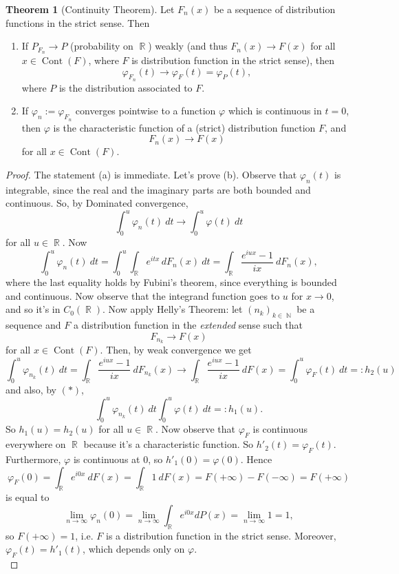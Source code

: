 \documentclass[12pt,a4paper]{report}
\theoremstyle{definition}
\newtheorem{theorem}{Theorem}[chapter] %
\theoremstyle{num.custom-title}
\DeclareMathOperator{\N}{\mathbb{N}}
\DeclareMathOperator{\R}{\mathbb{R}}
\DeclareMathOperator{\Cont}{Cont}
\renewcommand{\phi}{\varphi}
\renewcommand{\1}{\mathbbm{1}}
\begin{document}
\begin{theorem}[Continuity Theorem]
Let $F_n(x)$ be a sequence of distribution functions in the strict sense. Then
\begin{enumerate}
\item If $P_{F_n} \to P$ (probability on $\R$) weakly (and thus $F_n(x) \to F(x)$ for all $x \in \Cont(F)$, where $F$ is distribution function in the strict sense), then
\[
\phi_{F_n}(t) \to \phi_F(t) = \phi_P(t),
\]
where $P$ is the distribution associated to $F$.
\item If $\phi_n := \phi_{F_n}$ converges pointwise to a function $\phi$ which is continuous in $t=0$, then $\phi$ is the characteristic function of a (strict) distribution function $F$, and
\[
F_n(x) \to F(x)
\]
for all $x \in \Cont(F)$.
\end{enumerate}
\begin{proof}
The statement (a) is immediate. Let's prove (b). Observe that $\phi_n(t)$ is integrable, since the real and the imaginary parts are both bounded and continuous. So, by Dominated convergence,
\[
\int_0^u \phi_n(t) \ dt \to \int_0^u \phi(t) \ dt \tag{$(*)$}
\]
for all $u \in \R$. Now
\[
\int_0^u \phi_n(t) \ dt = \int_0^u \int_{\R} e^{itx} \, dF_n(x) \ dt = \int_{\R} \frac{e^{iux}-1}{ix} \ dF_n(x),
\]
where the last equality holds by Fubini's theorem, since everything is bounded and continuous. Now observe that the integrand function goes to $u$ for $x \to 0$, and so it's in $C_0(\R)$. Now apply Helly's Theorem: let $(n_k)_{k \in \N}$ be a sequence and $F$ a distribution function in the \emph{extended} sense such that
\[
F_{n_k} \to F(x)
\]
for all $x \in \Cont(F)$. Then, by weak convergence we get
\[
\int_0^u \phi_{n_k}(t) \ dt = \int_{\R} \frac{e^{iux}-1}{ix} \ dF_{n_k}(x) \to \int_{\R} \frac{e^{iux}-1}{ix} \ dF(x) = \int_0^u \phi_F(t) \ dt =: h_2(u)
\]
and also, by $(*)$,
\[
\int_0^u \phi_{n_k}(t) \ dt \int_0^u \phi(t) \ dt =: h_1(u).
\]
So $h_1(u) = h_2(u)$ for all $u \in \R$. Now observe that $\phi_F$ is continuous everywhere on $\R$ because it's a characteristic function. So $h'_2(t)=\phi_F(t)$. Furthermore, $\phi$ is continuous at $0$, so $h'_1(0)=\phi(0)$. Hence
\[
\phi_F(0) = \int_{\R} e^{i0x} \ dF(x) = \int_{\R} 1 \ dF(x) = F(+\infty)-F(-\infty) = F(+\infty)
\]
is equal to
\[
\lim_{n \to \infty} \phi_n(0) = \lim_{n \to \infty} \int_{\R} e^{i0x} dP(x) = \lim_{n \to \infty} 1 = 1,
\]
so $F(+\infty)=1$, i.e. $F$ is a distribution function in the strict sense. Moreover, $\phi_F(t)=h'_1(t)$, which depends only on $\phi$.\\

\end{proof}
\end{theorem}
\end{document}
